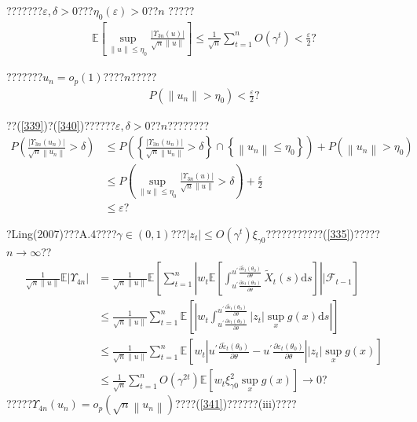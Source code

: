 \documentclass[a4paper,12pt,openany,oneside,utf-8]{ctexbook}
\begin{document}
	\noindent ???????$\varepsilon,\delta>0$???$\eta_0(\varepsilon)>0$??$n$ ?????
	\begin{align}\label{339}
		\mathbb{E}\left[\sup _{\|u\| \leq \eta_{0}} \frac{\left|\Upsilon_{3 n}(u)\right|}{\sqrt{n}\|u\|}\right] \leq \frac{1}{\sqrt{n}} \sum_{t=1}^{n} O\left(\gamma^{t}\right)<\frac{\varepsilon}{2}\mbox{?}
	\end{align}
	
	???????$u_n=o_p(1)$????$n$?????
	\begin{align}\label{340}
		P(\|u_n\|>\eta_0)<\frac{\varepsilon}{2}\mbox{?}
	\end{align}
	
	\noindent ??(\ref{339})?(\ref{340})??????$\varepsilon,\delta>0$??$n$????????
	\begin{align}\label{341}
		P\left(\frac{\left|\Upsilon_{3 n}\left(u_{n}\right)\right|}{\sqrt{n}\left\|u_{n}\right\|}>\delta\right) &\leq P\left(\left\{\frac{\left|\Upsilon_{3 n}\left(u_{n}\right)\right|}{\sqrt{n}\left\|u_{n}\right\|}>\delta\right\} \cap\left\{\left\|u_{n}\right\| \leq \eta_{0}\right\}\right)+P\left(\left\|u_{n}\right\|>\eta_{0}\right)\nonumber\\
		&\le P\left(\sup _{\|u\| \leq \eta_{0}} \frac{\left|\Upsilon_{3 n}(u)\right|}{\sqrt{n}\|u\|}>\delta\right)+\frac{\varepsilon}{2}\nonumber\\
		&\le \varepsilon \mbox{?}
	\end{align}
	
	?Ling(2007)???A.4????$\gamma\in(0,1)$???$\left|z_t\right|\le O(\gamma^t)\xi_{\gamma 0}$???????????(\ref{335})?????$n \rightarrow \infty$??
	\begin{align}
		\frac{1}{\sqrt{n}\|u\|} \mathbb{E}\left|\Upsilon_{4 n}\right|&=\frac{1}{\sqrt{n}\|u\|} \mathbb{E}\left[\sum_{t=1}^n\left|w_t\mathbb{E}\left[ \int_{u^{\prime}\frac{\partial\varepsilon_t(\theta_0)}{\partial\theta}}^{u^{\prime}\frac{\partial\tilde{\varepsilon}_t(\theta_0)}{\partial\theta}}\tilde{X}_t(s)\mathrm{d}s\right]\right|\Big|\mathcal{F}_{t-1}\right]\nonumber\\
		&\le \frac{1}{\sqrt{n}\|u\|} \sum_{t=1}^{n} \mathbb{E}\left[\left|w_{t}\int_{u^{\prime}\frac{\partial\varepsilon_t(\theta_0)}
			{\partial\theta}}^{u^{\prime}\frac{\partial\tilde{\varepsilon}_t(\theta_0)}{\partial\theta}}\left|z_t\right|\sup_xg(x)\mathrm{d}s\right|\right]\nonumber\\
		&\le \frac{1}{\sqrt{n}\|u\|} \sum_{t=1}^{n} \mathbb{E}\left[w_{t}\left|u^{\prime}\frac{\partial\tilde{\varepsilon}_t(\theta_0)}{\partial\theta}-u^{\prime}\frac{\partial\varepsilon_t(\theta_0)}{\partial\theta}\right|\left|z_t\right|\sup_xg(x)\right]\nonumber\\
		&\le \frac{1}{\sqrt{n}} \sum_{t=1}^{n} O\left(\gamma^{2t}\right) \mathbb{E}\left[w_t\xi^2_{\gamma 0}\sup_xg(x)\right] \rightarrow 0 \mbox{?}\nonumber
	\end{align}
	?????$\Upsilon_{4 n}\left(u_{n}\right)=o_{p}\left(\sqrt{n}\left\|u_{n}\right\|\right)$????(\ref{341})??????(iii)????
	
\end{document}
